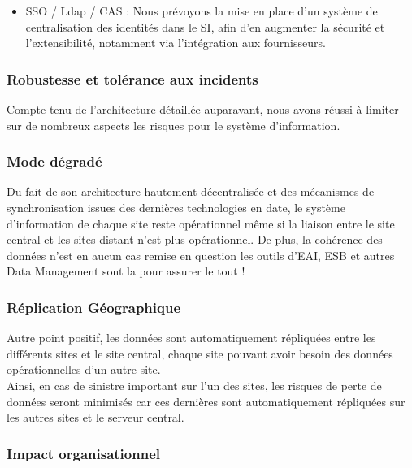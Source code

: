 \begin{itemize}
\item SSO / Ldap / CAS : Nous prévoyons la mise en place d'un système de centralisation des identités dans le SI, afin d'en augmenter la sécurité et l'extensibilité, notamment via l'intégration aux fournisseurs.
\end{itemize}

\subsubsection{Robustesse et tolérance aux incidents}

Compte tenu de l'architecture détaillée auparavant, nous avons réussi à limiter sur de nombreux aspects les risques pour le système d'information.\\

\subsubsection* {Mode dégradé}

Du fait de son architecture hautement décentralisée et des mécanismes de synchronisation issues des dernières technologies en date, le système d'information de chaque site reste opérationnel même si la liaison entre le site central et les sites distant n'est plus opérationnel. De plus, la cohérence des données n'est en aucun cas remise en question les outils d'EAI, ESB et autres Data Management sont la pour assurer le tout !

\subsubsection*{Réplication Géographique}
Autre point positif, les données sont automatiquement répliquées entre les différents sites et le site central, chaque site pouvant avoir besoin des données opérationnelles d'un autre site.\\
Ainsi, en cas de sinistre important sur l'un des sites, les risques de perte de données seront minimisés car ces dernières sont automatiquement répliquées sur les autres sites et le serveur central.

\subsubsection{Impact organisationnel}

